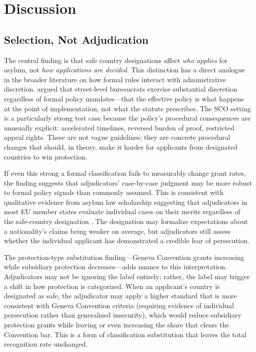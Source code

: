 \documentclass[12pt]{article}
\begin{document}


\section{Discussion}

\subsection{Selection, Not Adjudication}

The central finding is that safe country designations affect \textit{who applies} for asylum, not \textit{how applications are decided}. This distinction has a direct analogue in the broader literature on how formal rules interact with administrative discretion. \citet{lipsky2010street} argued that street-level bureaucrats exercise substantial discretion regardless of formal policy mandates---that the effective policy is what happens at the point of implementation, not what the statute prescribes. The SCO setting is a particularly strong test case because the policy's procedural consequences are unusually explicit: accelerated timelines, reversed burden of proof, restricted appeal rights. These are not vague guidelines; they are concrete procedural changes that should, in theory, make it harder for applicants from designated countries to win protection.

If even this strong a formal classification fails to measurably change grant rates, the finding suggests that adjudicators' case-by-case judgment may be more robust to formal policy signals than commonly assumed. This is consistent with qualitative evidence from asylum law scholarship suggesting that adjudicators in most EU member states evaluate individual cases on their merits regardless of the safe-country designation \citep{costello2016safe}. The designation may formalize expectations about a nationality's claims being weaker on average, but adjudicators still assess whether the individual applicant has demonstrated a credible fear of persecution.

The protection-type substitution finding---Geneva Convention grants increasing while subsidiary protection decreases---adds nuance to this interpretation. Adjudicators may not be ignoring the label entirely; rather, the label may trigger a shift in how protection is categorized. When an applicant's country is designated as safe, the adjudicator may apply a higher standard that is more consistent with Geneva Convention criteria (requiring evidence of individual persecution rather than generalized insecurity), which would reduce subsidiary protection grants while leaving or even increasing the share that clears the Convention bar. This is a form of classification substitution that leaves the total recognition rate unchanged.
\end{document}
